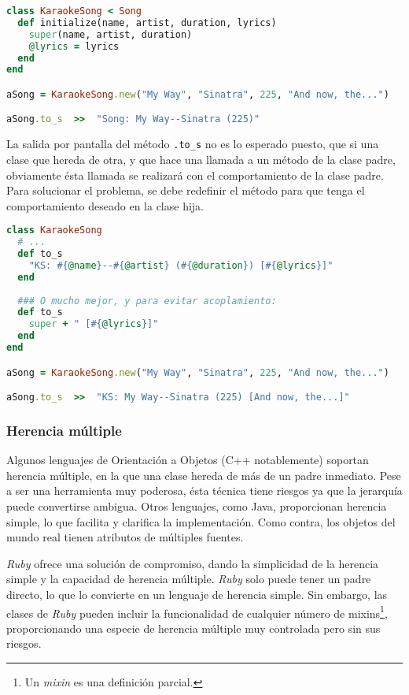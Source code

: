 \begin{lstlisting}[language=Ruby]
class KaraokeSong < Song
  def initialize(name, artist, duration, lyrics)
    super(name, artist, duration)
    @lyrics = lyrics
  end
end

aSong = KaraokeSong.new("My Way", "Sinatra", 225, "And now, the...")

aSong.to_s	>>	"Song: My Way--Sinatra (225)"
\end{lstlisting}

La salida por pantalla del método \texttt{.to\_s} no es lo esperado puesto, que si una clase que hereda de otra, y que hace una llamada a un método de la clase padre, obviamente ésta llamada se realizará con el comportamiento de la clase padre. Para solucionar el problema, se debe redefinir el método para que tenga el comportamiento deseado en la clase hija.

\begin{lstlisting}[language=Ruby]
class KaraokeSong
  # ...
  def to_s
    "KS: #{@name}--#{@artist} (#{@duration}) [#{@lyrics}]"    
  end
  
  ### O mucho mejor, y para evitar acoplamiento:
  def to_s
    super + " [#{@lyrics}]"
  end
end

aSong = KaraokeSong.new("My Way", "Sinatra", 225, "And now, the...")

aSong.to_s	>>	"KS: My Way--Sinatra (225) [And now, the...]"
\end{lstlisting}

\subsubsection{Herencia múltiple}
Algunos lenguajes de Orientación a Objetos (C++ notablemente) soportan herencia múltiple, en la que una clase hereda de más de un padre inmediato. Pese a ser una herramienta muy poderosa, ésta técnica tiene riesgos ya que la jerarquía puede convertirse ambigua.
Otros lenguajes, como Java, proporcionan herencia simple, lo que facilita y clarifica la implementación. Como contra, los objetos del mundo real tienen atributos de múltiples fuentes.

\textit{Ruby} ofrece una solución de compromiso, dando la simplicidad de la herencia simple y la capacidad de herencia múltiple. \textit{Ruby} solo puede tener un padre directo, lo que lo convierte en un lenguaje de herencia simple. Sin embargo, las clases de \textit{Ruby} pueden incluir la funcionalidad de cualquier número de mixins\footnote{Un \textit{mixin} es una definición parcial.}, proporcionando una especie de herencia múltiple muy controlada pero sin sus riesgos.

